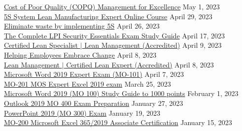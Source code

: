 \documentclass[10pt]{res} %
\begin{document}
\begin{resume}
\href{https://www.udemy.com/certificate/UC-ce2b0fd8-e8ae-4820-94cb-a0904dbd244b}{\color{blue}Cost of Poor Quality (COPQ) Management for Excellence} \hfill May 1, 2023 \\
\href{https://www.udemy.com/certificate/UC-eb29c07b-cd82-4f76-9aaf-ee4bf3374c68}{\color{blue}5S System Lean Manufacturing Expert Online Course} \hfill April 29, 2023 \\
\href{https://www.udemy.com/certificate/UC-86bc5e56-c24a-4791-b92a-996ae6bcab7b}{\color{blue}Eliminate waste by implementing 5S} \hfill April 26, 2023 \\
\href{https://www.udemy.com/certificate/UC-6de29d96-7bc1-4f29-952c-ee0108470fad}{\color{blue}The Complete LPI Security Essentials Exam Study Guide} \hfill April 17, 2023 \\
\href{https://www.udemy.com/certificate/UC-b70925be-913f-4808-9cb5-d3d675a73181}{\color{blue} Certified Lean Specialist $|$ Lean Management (Accredited)} \hfill April 9, 2023 \\
\href{https://www.udemy.com/certificate/UC-c36fc756-77d8-4567-bc90-9da0fe17c222}{\color{blue}Helping Employees Embrace Change} \hfill April 8, 2023 \\
\href{https://www.udemy.com/certificate/UC-5fb084fe-1d33-4227-9361-2c368ed0d658}{\color{blue}Lean Management $|$ Certified Lean Expert (Accredited)} \hfill April 8, 2023 \\
\href{https://www.udemy.com/certificate/UC-7df60ba8-c1f2-46b6-9071-c00e916acfb1}{\color{blue}Microsoft Word 2019 Expert Exam (MO-101)} \hfill April 7, 2023 \\
\href{https://www.udemy.com/certificate/UC-a95ab9ec-1e47-4e3d-bbee-d0355337acaf}{\color{blue}MO-201 MOS Expert Excel 2019 exam} \hfill March 25, 2023 \\
\href{https://www.udemy.com/certificate/UC-e2bbdeac-21ff-4fd6-95fa-4baca56b05a1}{\color{blue}Microsoft Word 2019 (MO 100) Study Guide to 1000 points} \hfill February 1, 2023 \\
\href{https://www.udemy.com/certificate/UC-ef82438f-d36c-4729-b36b-cdab73706ce9}{\color{blue}Outlook 2019 MO 400 Exam Preparation} \hfill January 27, 2023 \\
\href{https://www.udemy.com/certificate/UC-6538ec5c-583a-45eb-be11-4a35e1ce04bd}{\color{blue}PowerPoint 2019 (MO 300) Exam} \hfill January 19, 2023 \\
\href{https://www.udemy.com/certificate/UC-8960eb38-7c3f-4c2e-b2ad-2c547e132c70}{\color{blue}MO-200 Microsoft Excel 365/2019 Associate Certification} \hfill January 15, 2023 \\

\end{resume}
\end{document}
